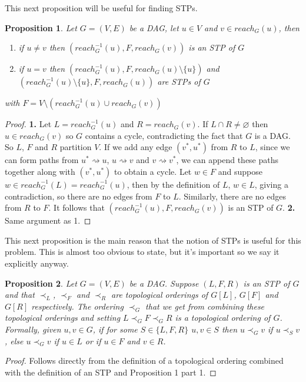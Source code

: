 \documentclass{article}
\newtheorem{proposition}{Proposition}
\begin{document}
This next proposition will be useful for finding STPs.
\begin{proposition}
Let $G=(V,E)$ be a DAG, let $u \in V$ and $v \in reach_{G}(u)$, then
\begin{enumerate}
\item if $u \neq v$ then $(reach_{G}^{-1}(u),F,reach_{G}(v))$ is an STP of $G$
\item if $u = v$ then $(reach_{G}^{-1}(u),F,reach_{G}(u) \setminus{\{u\}})$ and $(reach_{G}^{-1}(u) \setminus{\{u\}},F,reach_{G}(u))$ are STPs of $G$
\end{enumerate}
with $F=V \setminus (reach_{G}^{-1}(u) \cup reach_{G}(v))$
\end{proposition}

\begin{proof}
\textbf{1.} Let $L=reach_{G}^{-1}(u)$ and $R=reach_{G}(v)$. If $L \cap R \neq \varnothing$ then $u \in reach_{G}(v)$ so $G$ contains a cycle, contradicting the fact that $G$ is a DAG. So $L$, $F$ and $R$ partition $V$. If we add any edge $(v^{*},u^{*})$ from $R$ to $L$, since we can form paths from $u^{*} \rightsquigarrow u$, $u \rightsquigarrow v$ and $v \rightsquigarrow v^{*}$, we can append these paths together along with $(v^{*},u^{*})$ to obtain a cycle. Let $w \in F$ and suppose $w \in reach_{G}^{-1}(L) = reach_{G}^{-1}(u)$, then by the definition of $L$, $w \in L$, giving a contradiction, so there are no edges from $F$ to $L$. Similarly, there are no edges from $R$ to $F$. It follows that $(reach_{G}^{-1}(u),F,reach_{G}(v))$ is an STP of $G$.
\textbf{2.} Same argument as 1.
\end{proof}

This next proposition is the main reason that the notion of STPs is useful for this problem. This is almost too obvious to state, but it's important so we say it explicitly anyway.

\begin{proposition}
Let $G=(V,E)$ be a DAG. Suppose $(L,F,R)$ is an STP of $G$ and that $\prec_{L}$, $\prec_{F}$ and $\prec_{R}$ are topological orderings of $G[L]$, $G[F]$ and $G[R]$ respectively. The ordering $\prec_{G}$ that we get from combining these topological orderings and setting $L \prec_{G} F \prec_{G} R$ is a topological ordering of $G$. Formally, given $u, v \in G$, if for some $S \in \{ L,F,R\}$ $u,v \in S$ then $u \prec_{G} v$ if $u \prec_{S} v$, else $u \prec_{G} v$ if $u \in L$ or if $u \in F$ and $v \in R$.
\end{proposition}

\begin{proof}
Follows directly from the definition of a topological ordering combined with the definition of an STP and Proposition 1 part 1.
\end{proof}
\end{document}
